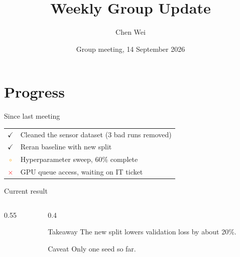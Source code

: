 \documentclass[aspectratio=169]{beamer}
\title{Weekly Group Update}
\author{Chen Wei}
\date{Group meeting, 14 September 2026}
\newcommand{\done}{\textcolor{green!50!black}{$\checkmark$}}
\newcommand{\wip}{\textcolor{orange}{$\circ$}}
\newcommand{\blocked}{\textcolor{red}{$\times$}}
\begin{document}
\begin{frame}
  \titlepage
\end{frame}

\section{Progress}
\begin{frame}{Since last meeting}
  \begin{tabular}{cl}
    \done & Cleaned the sensor dataset (3 bad runs removed) \\
    \done & Reran baseline with new split \\
    \wip & Hyperparameter sweep, 60\% complete \\
    \blocked & GPU queue access, waiting on IT ticket \\
  \end{tabular}
\end{frame}

\begin{frame}{Current result}
  \begin{columns}[c]
    \begin{column}{0.55\textwidth}
      \centering
    \end{column}
    \begin{column}{0.4\textwidth}
      \begin{block}{Takeaway}
        The new split lowers validation loss by about 20\%.
      \end{block}
      \begin{alertblock}{Caveat}
        Only one seed so far.
      \end{alertblock}
    \end{column}
  \end{columns}
\end{frame}
\end{document}
